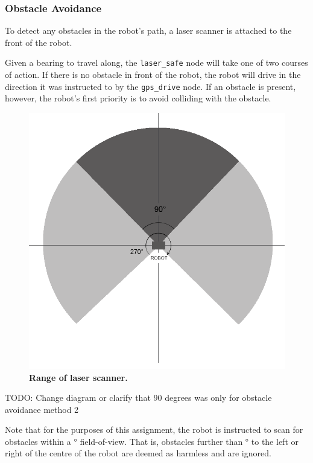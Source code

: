 \documentclass[titlepage,12pt,a4paper]{article}
\begin{document}
\subsubsection{Obstacle Avoidance}
To detect any obstacles in the robot's path, a laser scanner is attached to the front of the robot.

Given a bearing to travel along, the \verb|laser_safe| node will take one of two courses of action. If there is no obstacle in front of the robot, the robot will drive in the direction it was instructed to by the \verb|gps_drive| node. If an obstacle is present, however, the robot's first priority is to avoid colliding with the obstacle. 

\begin{figure}[h]
	\centering
	\includegraphics[scale=0.34]{figures/laser.png}
	\caption{\textbf{Range of laser scanner.}}
\end{figure}

TODO: Change diagram or clarify that 90 degrees was only for obstacle avoidance method 2

Note that for the purposes of this assignment, the robot is instructed to scan for obstacles within a \unit[150]{\degree} field-of-view. That is, obstacles further than \unit[75]{\degree} to the left or right of the centre of the robot are deemed as harmless and are ignored.
\end{document}
